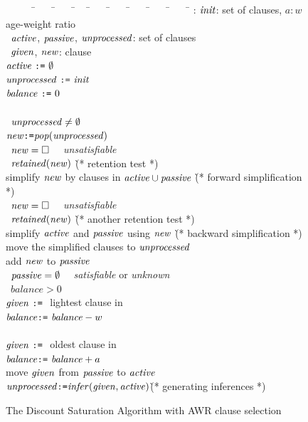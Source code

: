 \documentclass{llncs}
\newcommand{\Balance}{\ensuremath{\mathit{balance}}}
\begin{document}
\begin{figure}[t]
\begin{tabbing}
~~~~~~\=~~~~\=~~~~\=~~~\=~~~~\=~~~~\=~~~~\=~~~~\=~~~~\=\kill
\>\INPUT: $\mathit{init}$: set of clauses\semicol, $a:w$ age-weight ratio \\
\>\VAR\ $\mathit{active}$, $\mathit{passive}$, $\mathit{unprocessed}$: set of clauses\semicol \\
\>\VAR\ $\mathit{given}$, $\mathit{new}$: clause\semicol\\
\>$\mathit{active}\ \texttt{:=}\ \emptyset$\semicol \\
\>$\mathit{unprocessed}\ \texttt{:=}\ \mathit{init}$\semicol \\
\Mark
\>$\Balance\ \assign\ 0$\semicol\\
\>\LOOP\\ 
\>\>\WHILE\ $\mathit{unprocessed} \neq \emptyset$ \\
\>\>\>$\mathit{new} \texttt{:=} \mathit{pop}(\mathit{unprocessed})$\semicol \\ 
\>\>\>\IF\ $\mathit{new} = \Box$ \THEN\ \RETURN\ \textit{unsatisfiable}\semicol \\
\>\>\>\IF\ $\mathit{retained}(\mathit{new})$ \THEN \` (* retention test *) \\ %
\>\>\>\>simplify $\mathit{new}$ by clauses in $\mathit{active} \cup \mathit{passive}$ \semicol 
                        \` (* forward simplification *) \\
\>\>\>\>\IF\ $\mathit{new} = \Box$ \THEN\ \RETURN\ \textit{unsatisfiable}\semicol \\
\>\>\>\>\IF\ $\mathit{retained}(\mathit{new})$ \THEN
                        \` (* another retention test *) \\
\>\>\>\>\>simplify $\mathit{active}$ and  $\mathit{passive}$ using $\mathit{new}$ \semicol
                        \` (* backward simplification *) \\
\>\>\>\>\>move the simplified clauses to $\mathit{unprocessed}$\semicol \\
\>\>\>\>\>add $\mathit{new}$ to $\mathit{passive}$\\ %
\>\>\IF\ $\mathit{passive} = \emptyset$ \THEN\
          \RETURN\ \textit{satisfiable} or \textit{unknown}\\
\Mark
\>\>\IF\ $\Balance > 0$ \THEN\\
\Mark
\>\>\>\>$\mathit{given}\ \texttt{:=}\ $ lightest clause in \Passive\semicol\\
\Mark
\>\>\>\>$\Balance \assign\ \Balance - w$\semicol\\
\Mark
\>\>\ELSE\\
\Mark
\>\>\>\>$\mathit{given}\ \texttt{:=}\ $ oldest clause in \Passive\semicol\\
\Mark
\>\>\>\>$\Balance \assign\ \Balance + a$\semicol\\
\>\>move $\mathit{given}$ from $\mathit{passive}$ to $\mathit{active}$\semicol \\
\>\>$\mathit{unprocessed} \texttt{:=} \mathit{infer}(\mathit{given},\mathit{active})$\semicol \` (* generating inferences *)\\
\end{tabbing}

                \caption{The Discount Saturation Algorithm with AWR clause selection
	        \label{fig:discount}}

\end{figure}
\end{document}
